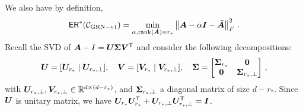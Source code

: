 We also have by definition,
\begin{align}\label{eq:Err-Gen1-0}
   {\sf ER}^*(\mathcal{C}_{\rm GRN-v1{}}) =  \min_{\alpha,\operatorname{rank}(\tilde{{\bm{A}}})=r_*} \left\|{\bm{A}}-\alpha\bm{I} - \tilde{{\bm{A}}}\right\|_{F}^2\,.
\end{align}
%
Recall the SVD of ${\bm{A}}-I = {\bm{U}}\boldsymbol{\Sigma} {\bm{V}}^{\sf T}$ and consider the following decompositions:
\begin{align*}
    {\bm{U}} = [{\bm{U}}_{r_*}\;|\; {\bm{U}}_{r_*,\perp}],\quad {\bm{V}} = [{\bm{V}}_{r_*}\;|\; {\bm{V}}_{r_*,\perp}], \quad
    \boldsymbol{\Sigma} = \begin{bmatrix} \boldsymbol{\Sigma}_{r_*} & \mathbf{0}\\
    \mathbf{0} & \boldsymbol{\Sigma}_{r_*,\perp}\end{bmatrix}\,,
\end{align*}
with ${\bm{U}}_{r_*,\perp}, {\bm{V}}_{r_*,\perp}\in\mathbb{R}^{d\times (d-r_*)}$, and $\boldsymbol{\Sigma}_{r_*,\perp}$ a diagonal matrix of size $d-r_*$. Since ${\bm{U}}$ is unitary matrix, we have ${\bm{U}}_{r_*}{\bm{U}}_{r_*}^{\sf T} + {\bm{U}}_{r_*,\perp}{\bm{U}}_{r_*,\perp}^{\sf T} = \bm{I}$.
 

